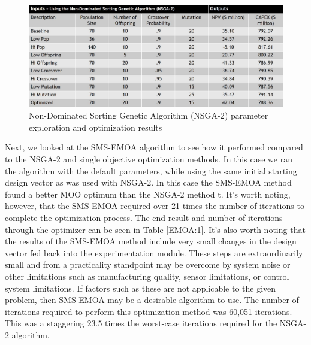 \documentclass[balance,upint,subscriptcorrection,varvw,mathalfa=cal=boondoxo,spanish,french,vietnamese,russian,greek,pdf-a,colorlinks]{asmeconf}
\begin{document}


\begin{figure}[btp]
\centering\includegraphics[width=0.7\linewidth]{images/NSGA.jpg}
\caption{Non-Dominated Sorting Genetic Algorithm (NSGA-2) parameter exploration and optimization results}\label{NSGA:1}
\end{figure}


Next, we looked at the SMS-EMOA algorithm to see how it performed compared to the NSGA-2 and single objective optimization methods. In this case we ran the algorithm with the default parameters, while using the same initial starting design vector as was used with NSGA-2. In this case the SMS-EMOA method found a better MOO optimum than the NSGA-2 method t. It's worth noting, however, that the SMS-EMOA required over 21 times the number of iterations to complete the optimization process. The end result and number of iterations through the optimizer can be seen in Table \ref{EMOA:1}. It's also worth noting that the results of the SMS-EMOA method include very small changes in the design vector fed back into the experimentation module. These steps are extraordinarily small and from a practicality standpoint may be overcome by system noise or other  limitations such as manufacturing quality, sensor limitations, or control system limitations. If factors such as these are not applicable to the given problem, then SMS-EMOA may be a desirable algorithm to use. The number of iterations required to perform this optimization method was 60,051 iterations. This was a staggering 23.5 times the worst-case iterations required for the NSGA-2 algorithm.   

\begin{table}[btp]
\caption[Table]{SMS EMOA vs. NSGA-2}\label{EMOA:1}
\end{table}
\end{document}
